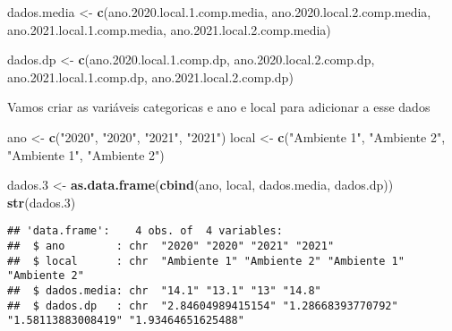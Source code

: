 \documentclass[titlepage, oneside, openany, a4paper]{book}
\newenvironment{Shaded}{\begin{snugshade}}{\end{snugshade}}
\newcommand{\FloatTok}[1]{\textcolor[rgb]{0.00,0.00,0.81}{#1}}
\newcommand{\KeywordTok}[1]{\textcolor[rgb]{0.13,0.29,0.53}{\textbf{#1}}}
\newcommand{\NormalTok}[1]{#1}
\newcommand{\StringTok}[1]{\textcolor[rgb]{0.31,0.60,0.02}{#1}}
\begin{document}
\begin{Shaded}
\begin{Highlighting}[]
\NormalTok{dados.media <-}\StringTok{ }\KeywordTok{c}\NormalTok{(ano.}\FloatTok{2020.}\NormalTok{local.}\FloatTok{1.}\NormalTok{comp.media,}
\NormalTok{                 ano.}\FloatTok{2020.}\NormalTok{local.}\FloatTok{2.}\NormalTok{comp.media,}
\NormalTok{                 ano.}\FloatTok{2021.}\NormalTok{local.}\FloatTok{1.}\NormalTok{comp.media,}
\NormalTok{                 ano.}\FloatTok{2021.}\NormalTok{local.}\FloatTok{2.}\NormalTok{comp.media)}

\NormalTok{dados.dp <-}\StringTok{ }\KeywordTok{c}\NormalTok{(ano.}\FloatTok{2020.}\NormalTok{local.}\FloatTok{1.}\NormalTok{comp.dp,}
\NormalTok{              ano.}\FloatTok{2020.}\NormalTok{local.}\FloatTok{2.}\NormalTok{comp.dp,}
\NormalTok{              ano.}\FloatTok{2021.}\NormalTok{local.}\FloatTok{1.}\NormalTok{comp.dp,}
\NormalTok{              ano.}\FloatTok{2021.}\NormalTok{local.}\FloatTok{2.}\NormalTok{comp.dp)}
\end{Highlighting}
\end{Shaded}

Vamos criar as variáveis categoricas e ano e local para adicionar a esse dados

\begin{Shaded}
\begin{Highlighting}[]
\NormalTok{ano <-}\StringTok{ }\KeywordTok{c}\NormalTok{(}\StringTok{"2020"}\NormalTok{, }\StringTok{"2020"}\NormalTok{, }\StringTok{"2021"}\NormalTok{, }\StringTok{"2021"}\NormalTok{)}
\NormalTok{local <-}\StringTok{ }\KeywordTok{c}\NormalTok{(}\StringTok{"Ambiente 1"}\NormalTok{, }\StringTok{"Ambiente 2"}\NormalTok{, }\StringTok{"Ambiente 1"}\NormalTok{, }\StringTok{"Ambiente 2"}\NormalTok{)}

\NormalTok{dados}\FloatTok{.3}\NormalTok{ <-}\StringTok{ }\KeywordTok{as.data.frame}\NormalTok{(}\KeywordTok{cbind}\NormalTok{(ano, local, dados.media, dados.dp))}
\KeywordTok{str}\NormalTok{(dados}\FloatTok{.3}\NormalTok{)}
\end{Highlighting}
\end{Shaded}

\begin{verbatim}
## 'data.frame':    4 obs. of  4 variables:
##  $ ano        : chr  "2020" "2020" "2021" "2021"
##  $ local      : chr  "Ambiente 1" "Ambiente 2" "Ambiente 1" "Ambiente 2"
##  $ dados.media: chr  "14.1" "13.1" "13" "14.8"
##  $ dados.dp   : chr  "2.84604989415154" "1.28668393770792" "1.58113883008419" "1.93464651625488"
\end{verbatim}
\end{document}
